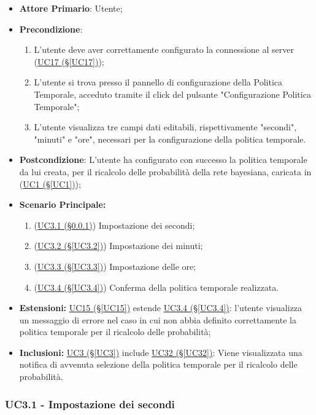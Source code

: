 \begin{itemize}
	\item \textbf{Attore Primario}: Utente;
	\item \textbf{Precondizione}:
		\begin{enumerate}
			\item L'utente deve aver correttamente configurato la connessione al server (\hyperref[UC17]{UC17 (§\ref*{UC17})});
			\item L'utente si trova presso il pannello di configurazione della Politica Temporale, acceduto tramite il click del pulsante "Configurazione Politica Temporale";
			\item L'utente visualizza tre campi dati editabili, rispettivamente "secondi", "minuti" e "ore", necessari per la configurazione della politica temporale.
		\end{enumerate}
	\item \textbf{Postcondizione}: L'utente ha configurato con successo la politica temporale da lui creata, per il ricalcolo delle probabilità della rete bayesiana, caricata in (\hyperref[UC1]{UC1 (§\ref*{UC1})});
	\item \textbf{Scenario Principale:}
	\begin{enumerate}
		\item (\hyperref[UC3.1]{UC3.1 (§\ref*{UC3.1})}) Impostazione dei secondi;
		\item (\hyperref[UC3.2]{UC3.2 (§\ref*{UC3.2})}) Impostazione dei minuti;
		\item (\hyperref[UC3.3]{UC3.3 (§\ref*{UC3.3})}) Impostazione delle ore;
		\item (\hyperref[UC3.4]{UC3.4 (§\ref*{UC3.4})}) Conferma della politica temporale realizzata.
	\end{enumerate}
	\item \textbf{Estensioni:} \hyperref[UC15]{UC15 (§\ref*{UC15})} estende \hyperref[UC3.4]{UC3.4 (§\ref*{UC3.4})}: l'utente visualizza un messaggio di errore nel caso in cui non abbia definito correttamente la politica temporale per il ricalcolo delle probabilità;
	\item \textbf{Inclusioni:} \hyperref[UC3]{UC3 (§\ref*{UC3})} include \hyperref[UC32]{UC32 (§\ref*{UC32})}: Viene visualizzata una notifica di avvenuta selezione della politica temporale per il ricalcolo delle probabilità.
\end{itemize}

\pagebreak

\subsubsection{UC3.1 - Impostazione dei secondi}\label{UC3.1}

